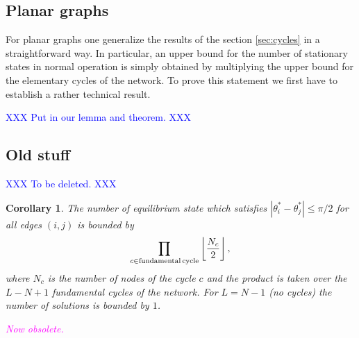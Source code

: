 \documentclass[10pt,aps,pre,preprint,superscriptaddress]{revtex4-1}
\newcommand{\dirk}[1]{\textcolor{blue}{#1}}
\newcommand{\debsankha}[1]{\textcolor{magenta}{#1}}
\newcommand{\be}{\begin{equation}}
\newcommand{\ee}{\end{equation}}
\newtheorem{corr}{Corollary}
\begin{document}
\subsection{Planar graphs}

For planar graphs one generalize the results of the section \ref{sec:cycles} in 
a straightforward way. In particular, an upper bound for the number of stationary states
in normal operation is simply obtained by multiplying the upper bound for the 
elementary cycles of the network. To prove this statement we first have to establish
a rather technical result.

\dirk{XXX Put in our lemma and theorem. XXX}

\subsection{Old stuff}

\dirk{XXX To be deleted. XXX}

\begin{corr}
The number of equilibrium state which satisfies 
$|\theta_i^*  - \theta_j^*| \le \pi/2$ for all edges $(i,j)$
is bounded by
\be
   \prod_{c \in \rm{fundamental \, cycle}} \left\lfloor \frac{N_c}{2} \right \rfloor,
   \label{eqn:numsol-cycle}
\ee
where $N_c$ is the number of nodes of the cycle $c$ and
the product is taken over the $L-N+1$ fundamental cycles
of the network. For $L = N-1$ (no cycles) the number of 
solutions is bounded by $1$.

\debsankha{Now obsolete.}
\end{corr}
\end{document}

